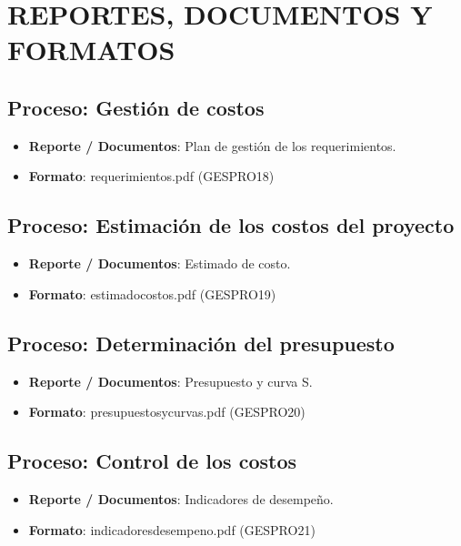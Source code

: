 \chapter{REPORTES, DOCUMENTOS Y FORMATOS}
%
\section{Proceso: Gesti\'on de costos}
%
\begin{itemize}
	\item \textbf{Reporte / Documentos}: Plan de gesti\'on de los requerimientos.
	\item \textbf{Formato}: requerimientos.pdf (GESPRO18)
\end{itemize}
%
%
\section{Proceso: Estimaci\'on de los costos del proyecto}
%
\begin{itemize}
	\item \textbf{Reporte / Documentos}: Estimado de costo.
	\item \textbf{Formato}: estimadocostos.pdf (GESPRO19)
\end{itemize}
%
\section{Proceso: Determinaci\'on del presupuesto}
%
\begin{itemize}
	\item \textbf{Reporte / Documentos}: Presupuesto y curva S.
	\item \textbf{Formato}: presupuestosycurvas.pdf (GESPRO20)
\end{itemize}
%
\section{Proceso: Control de los costos}
%
\begin{itemize}
	\item \textbf{Reporte / Documentos}: Indicadores de desempe\~no.
	\item \textbf{Formato}: indicadoresdesempeno.pdf (GESPRO21)
\end{itemize}